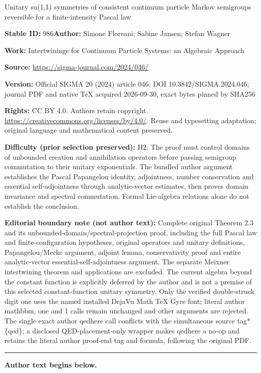 \documentclass[11pt]{article}
\numberwithin{equation}{section}
\numberwithin{equation}{section}
\newcommand{\1}{\mathbbm{1}}
\begin{document}
\begin{center}\Large Unitary su(1,1) symmetries of consistent continuum particle Markov semigroups reversible for a finite-intensity Pascal law\end{center}
\noindent\textbf{Stable ID:} 986\quad\textbf{Author:} Simone Floreani; Sabine Jansen; Stefan Wagner\par
\noindent\textbf{Work:} Intertwinings for Continuum Particle Systems: an Algebraic Approach\par
\noindent\textbf{Source:} \url{https://sigma-journal.com/2024/046/}\par
\noindent\textbf{Version:} Official SIGMA 20 (2024) article 046, DOI 10.3842/SIGMA.2024.046; journal PDF and native TeX acquired 2026-09-30, exact bytes pinned by SHA256\par
\noindent\textbf{Rights:} CC BY 4.0. Authors retain copyright. \url{https://creativecommons.org/licenses/by/4.0/}. Reuse and typesetting adaptation; original language and mathematical content preserved.\par
\noindent\textbf{Difficulty (prior selection preserved):} {\CJKfont H2: The proof must control domains of unbounded creation and annihilation operators before passing semigroup commutation to their unitary exponentials. The bundled author argument establishes the Pascal Papangelou identity, adjointness, number conservation and essential self-adjointness through analytic-vector estimates, then proves domain invariance and spectral commutation. Formal Lie-algebra relations alone do not establish the conclusion.}\par
\medskip\noindent\textbf{Editorial boundary note (not author text):} Complete original Theorem 2.3 and its unbounded-domain/spectral-projection proof, including the full Pascal law and finite-configuration hypotheses, original operators and unitary definitions, Papangelou/Mecke argument, adjoint lemma, conservativity proof and entire analytic-vector essential-self-adjointness argument. The separate Meixner intertwining theorem and applications are excluded. The current algebra beyond the constant function is explicitly deferred by the author and is not a premise of this selected constant-function unitary symmetry. Only the verified double-struck digit one uses the named installed DejaVu Math TeX Gyre font; literal author mathbbm, one and 1 calls remain unchanged and other arguments are rejected. The single exact author qedhere call conflicts with the simultaneous source tag*\{qed\}; a disclosed QED-placement-only wrapper makes qedhere a no-op and retains the literal author proof-end tag and formula, following the original PDF.\par
\medskip\hrule\medskip\noindent\textbf{Author text begins below.}\par
\setcounter{section}{1}
\end{document}
